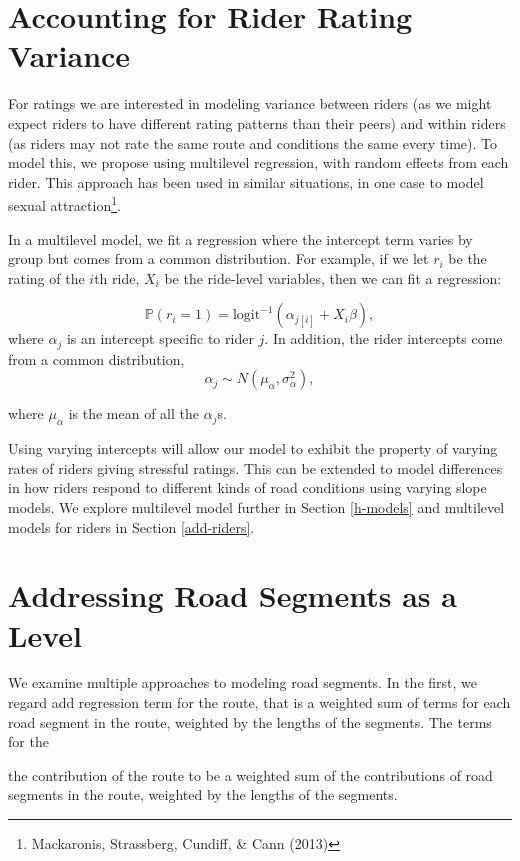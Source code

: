 \documentclass[12pt,twoside]{reedthesis}
\begin{document}
  \section{Accounting for Rider Rating
  Variance}\label{accounting-for-rider-rating-variance}
  
  For ratings we are interested in modeling variance between riders (as we
  might expect riders to have different rating patterns than their peers)
  and within riders (as riders may not rate the same route and conditions
  the same every time). To model this, we propose using multilevel
  regression, with random effects from each rider. This approach has been
  used in similar situations, in one case to model sexual
  attraction\footnote{Mackaronis, Strassberg, Cundiff, \& Cann (2013)}.
  
  In a multilevel model, we fit a regression where the intercept term
  varies by group but comes from a common distribution. For example, if we
  let \(r_i\) be the rating of the \(i\)th ride, \(X_i\) be the ride-level
  variables, then we can fit a regression:
  
  \[\mathbb{P}(r_i = 1) = \text{logit}^{-1}
  \left( \alpha_{j[i]} +  X_i \beta \right) ,\] where \(\alpha_j\) is an
  intercept specific to rider \(j\). In addition, the rider intercepts
  come from a common distribution,
  \[\alpha_j \sim N (\mu_\alpha, \sigma^2_\alpha),\]
  
  where \(\mu_\alpha\) is the mean of all the \(\alpha_j\)s.
  
  Using varying intercepts will allow our model to exhibit the property of
  varying rates of riders giving stressful ratings. This can be extended
  to model differences in how riders respond to different kinds of road
  conditions using varying slope models. We explore multilevel model
  further in Section \autoref{h-models} and multilevel models for riders
  in Section \autoref{add-riders}.
  
  \section{Addressing Road Segments as a
  Level}\label{addressing-road-segments-as-a-level}
  
  We examine multiple approaches to modeling road segments. In the first,
  we regard add regression term for the route, that is a weighted sum of
  terms for each road segment in the route, weighted by the lengths of the
  segments. The terms for the
  
  the contribution of the route to be a weighted sum of the contributions
  of road segments in the route, weighted by the lengths of the segments.
  
\end{document}
